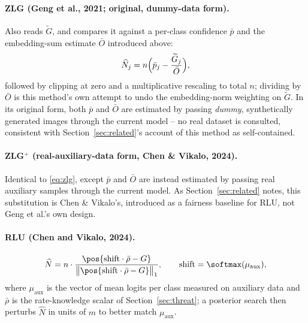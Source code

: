 \paragraph{ZLG (Geng et al., 2021; original, dummy-data form).}
Also reads $\widetilde G$, and compares it against a per-class confidence
$\bar p$ and the embedding-sum estimate $\bar O$ introduced above:
\begin{equation}
 \widehat N_j = n\Bigl(\bar p_j - \frac{\widetilde G_j}{\bar O}\Bigr),
 \label{eq:zlg}
\end{equation}
followed by clipping at zero and a multiplicative rescaling to total $n$;
dividing by $\bar O$ is this method's own attempt to undo the
embedding-norm weighting on $\widetilde G$. In its original form, both
$\bar p$ and $\bar O$ are estimated by passing \emph{dummy},
synthetically generated images through the current model -- no real
dataset is consulted, consistent with Section~\ref{sec:related}'s account
of this method as self-contained.

\paragraph{ZLG$^+$ (real-auxiliary-data form, Chen \& Vikalo, 2024).}
Identical to \eqref{eq:zlg}, except $\bar p$ and $\bar O$ are instead
estimated by passing real auxiliary samples through the current model.
As Section~\ref{sec:related} notes, this substitution is Chen \&
Vikalo's, introduced as a fairness baseline for RLU, not Geng et al.'s own
design.

\paragraph{RLU (Chen and Vikalo, 2024).}
\begin{equation}
 \widehat N = n \cdot \frac{\pos{\mathrm{shift}\cdot\bar\rho - G}}
                           {\bigl\|\pos{\mathrm{shift}\cdot\bar\rho - G}\bigr\|_1},
 \qquad \mathrm{shift} = \softmax(\mu_{\mathrm{aux}}),
 \label{eq:rlu}
\end{equation}
where $\mu_{\mathrm{aux}}$ is the vector of mean logits per class measured
on auxiliary data and $\bar\rho$ is the rate-knowledge scalar of
Section~\ref{sec:threat}; a posterior search then perturbs $\widehat N$ in
units of $m$ to better match $\mu_{\mathrm{aux}}$.

